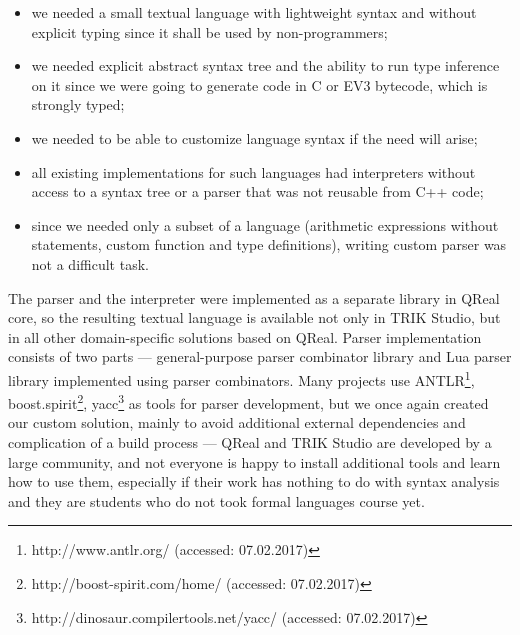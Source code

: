 \documentclass[conference]{IEEEtran}
\begin{document}
\begin{itemize}
	\item we needed a small textual language with lightweight syntax and without explicit typing since it shall be used by non-programmers;
	\item we needed explicit abstract syntax tree and the ability to run type inference on it since we were going to generate code in C or EV3 bytecode, which is strongly typed;
	\item we needed to be able to customize language syntax if the need will arise;
	\item all existing implementations for such languages had interpreters without access to a syntax tree or a parser that was not reusable from C++ code;
	\item since we needed only a subset of a language (arithmetic expressions without statements, custom function and type definitions), writing custom parser was not a difficult task.
\end{itemize}

The parser and the interpreter were implemented as a separate library in QReal core, so the resulting textual language is available not only in TRIK Studio, but in all other domain-specific solutions based on QReal. Parser implementation consists of two parts --- general-purpose parser combinator library and Lua parser library implemented using parser combinators. Many projects use ANTLR\footnote{http://www.antlr.org/ (accessed: 07.02.2017)}, boost.spirit\footnote{http://boost-spirit.com/home/ (accessed: 07.02.2017)}, yacc\footnote{http://dinosaur.compilertools.net/yacc/ (accessed: 07.02.2017)} as tools for parser development, but we once again created our custom solution, mainly to avoid additional external dependencies and complication of a build process --- QReal and TRIK Studio are developed by a large community, and not everyone is happy to install additional tools and learn how to use them, especially if their work has nothing to do with syntax analysis and they are students who do not took formal languages course yet.
\end{document}
